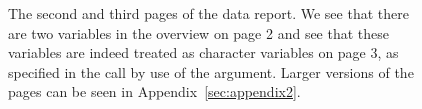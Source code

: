 \documentclass[article,shortnames]{jss}
\begin{document}
\begin{figure}[tb]
\begin{center}
\end{center}
\caption{The second and third pages of the  data report. We see that there are two  variables in the overview on page 2 and see that these variables are indeed treated as character variables on page 3, as specified in the  call by use of the  argument. Larger versions of the pages can be seen in
  Appendix~\ref{sec:appendix2}.}
\label{fig:bigExampleP23}
\end{figure}
\end{document}
